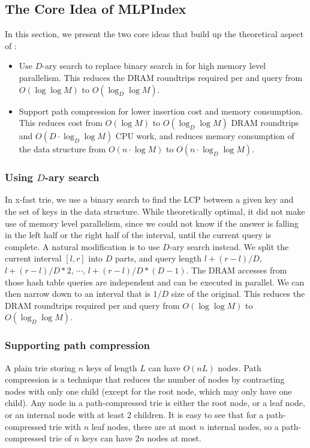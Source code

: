 \documentclass[11pt, usletter]{article}
\begin{document}
\subsection{The Core Idea of MLPIndex} \label{mlpindex_simple}

In this section, we present the two core ideas that build up the theoretical aspect of \MlpIndex:
\begin{itemize}
[topsep=0pt,partopsep=0pt,itemsep=0pt,parsep=0pt,fullwidth,itemindent=\parindent,listparindent=\parindent]
\item Use $D$-ary search to replace binary search in \QueryLCP for high memory level parallelism.
This reduces the DRAM roundtrips required per \lookup and \lowerbound query from $O(\log\log M)$ to $O(\log_D\log M)$.
\item Support path compression for lower insertion cost and memory consumption. 
This reduces \insertion cost from $O(\log M)$ to $O(\log_D\log M)$ DRAM roundtrips and $O(D\cdot \log_D\log M)$ CPU work, 
and reduces memory consumption of the data structure from $O(n\cdot\log M)$ to $O(n\cdot\log_D\log M)$.
\end{itemize}

\subsubsection*{Using $D$-ary search}

In x-fast trie, we use a binary search to find the LCP between a given key and the set of keys in the data structure.
While theoretically optimal, it did not make use of memory level parallelism, 
since we could not know if the answer is falling in the left half or the right half of the interval, 
until the current query is complete. 
A natural modification is to use $D$-ary search instead. 
We split the current interval $[l,r]$ into $D$ parts, 
and query length $l+(r-l)/D$, $l+(r-l)/D*2$, $\cdots$, $l+(r-l)/D*(D-1)$.
The DRAM accesses from those hash table queries are independent and can be executed in parallel.
We can then narrow down to an interval that is $1/D$ size of the original.
This reduces the DRAM roundtrips required per \lookup and \lowerbound query from $O(\log\log M)$ to $O(\log_D\log M)$.

\subsubsection*{Supporting path compression}

A plain trie storing $n$ keys of length $L$ can have $O(nL)$ nodes.
Path compression is a technique that reduces the number of nodes by contracting nodes with only one child 
(except for the root node, which may only have one child). 
Any node in a path-compressed trie is either the root node, or a leaf node, or an internal node with at least 2 children. 
It is easy to see that for a path-compressed trie with $n$ leaf nodes, there are at most $n$ internal nodes, 
so a path-compressed trie of $n$ keys can have $2n$ nodes at most.
\end{document}
